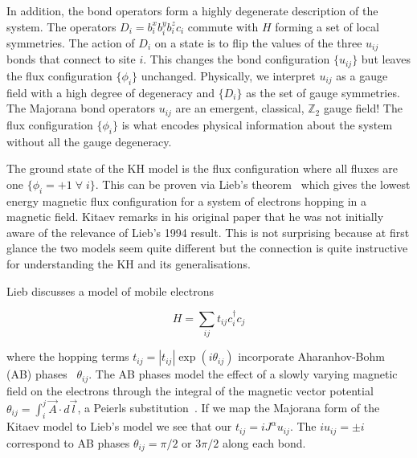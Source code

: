 In addition, the bond operators form a highly degenerate description of the system. The operators \(D_i = b^x_i b^y_i b^z_i c_i\) commute with \(H\) forming a set of local symmetries. The action of \(D_i\) on a state is to flip the values of the three \(u_{ij}\) bonds that connect to site \(i\). This changes the bond configuration \(\{u_{ij}\}\) but leaves the flux configuration \(\{\phi_i\}\) unchanged. Physically, we interpret \(u_{ij}\) as a gauge field with a high degree of degeneracy and \(\{D_i\}\) as the set of gauge symmetries. The Majorana bond operators \(u_{ij}\) are an emergent, classical, \(\mathbb{Z}_2\) gauge field! The flux configuration \(\{\phi_i\}\) is what encodes physical information about the system without all the gauge degeneracy.

The ground state of the KH model is the flux configuration where all fluxes are one \(\{\phi_i = +1\; \forall \; i\}\). This can be proven via Lieb's theorem~\autocite{lieb_flux_1994} which gives the lowest energy magnetic flux configuration for a system of electrons hopping in a magnetic field. Kitaev remarks in his original paper that he was not initially aware of the relevance of Lieb's 1994 result. This is not surprising because at first glance the two models seem quite different but the connection is quite instructive for understanding the KH and its generalisations.

Lieb discusses a model of mobile electrons

\[H = \sum_{ij} t_{ij} c^\dagger_i c_j\]

where the hopping terms \(t_{ij} = |t_{ij}|\exp(i\theta_{ij})\) incorporate Aharanhov-Bohm (AB) phases~\autocite{aharonovSignificanceElectromagneticPotentials1959} \(\theta_{ij}\). The AB phases model the effect of a slowly varying magnetic field on the electrons through the integral of the magnetic vector potential \(\theta_{ij} = \int_i^j \vec{A} \cdot d\vec{l}\), a Peierls substitution~\autocite{peierlsZurTheorieDiamagnetismus1933}. If we map the Majorana form of the Kitaev model to Lieb's model we see that our \(t_{ij} = i J^\alpha u_{ij}\). The \(i u_{ij} = \pm i\) correspond to AB phases \(\theta_{ij} = \pi/2\) or \(3\pi/2\) along each bond.

